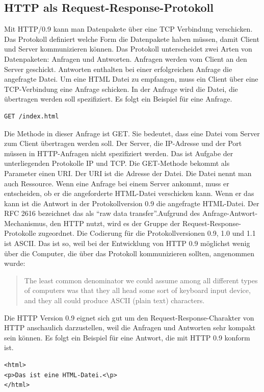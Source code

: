 \documentclass{llncs}
\begin{document}
\subsection{HTTP als Request-Response-Protokoll}
Mit HTTP/0.9 kann man Datenpakete über eine TCP Verbindung verschicken. Das Protokoll definiert welche Form die Datenpakete haben müssen, damit Client und Server kommunizieren können. Das Protokoll unterscheidet zwei Arten von Datenpaketen: Anfragen und Antworten. Anfragen werden vom Client an den Server geschickt. Antworten enthalten bei einer erfolgreichen Anfrage die angefragte Datei. Um eine HTML Datei zu empfangen, muss ein Client über eine TCP-Verbindung eine Anfrage schicken. In der Anfrage wird die Datei, die übertragen werden soll spezifiziert. Es folgt ein Beispiel für eine Anfrage.
\begin{verbatim}
GET /index.html
\end{verbatim}
Die Methode in dieser Anfrage ist GET. Sie bedeutet, dass eine Datei vom Server zum Client übertragen werden soll. Der Server, die IP-Adresse und der Port müssen in HTTP-Anfragen nicht spezifiziert werden. Das ist Aufgabe der unterliegenden Protokolle IP und TCP. Die GET-Methode bekommt als Parameter einen URI. Der URI ist die Adresse der Datei. Die Datei nennt man auch Ressource.\newline
Wenn eine Anfrage bei einem Server ankommt, muss er entscheiden, ob er die angeforderte HTML-Datei verschicken kann. Wenn er das kann ist die Antwort in der Protokollversion 0.9 die angefragte HTML-Datei. Der RFC 2616 bezeichnet das als ``raw data transfer''.\newline Aufgrund des Anfrage-Antwort-Mechanismus, den HTTP nutzt, wird es der Gruppe der Request-Response-Protokolle zugeordnet. Die Codierung für die Protokollversionen 0.9, 1.0 und 1.1 ist ASCII. Das ist so, weil bei der Entwicklung von HTTP 0.9 möglichst wenig über die Computer, die über das Protokoll kommunizieren sollten, angenommen wurde: \begin{quote} The least common denominator we could assume among all different types of computers was that they all head some sort of keyboard input device, and they all could produce ASCII (plain text) characters. \cite{Berners-Lee1999} \end{quote} Die HTTP Version 0.9 eignet sich gut um den Request-Response-Charakter von HTTP anschaulich darzustellen, weil die Anfragen und Antworten sehr kompakt sein können. Es folgt ein Beispiel für eine Antwort, die mit HTTP 0.9 konform ist.
\begin{verbatim}
<html>
<p>Das ist eine HTML-Datei.<\p>
</html>
\end{verbatim}
\end{document}
